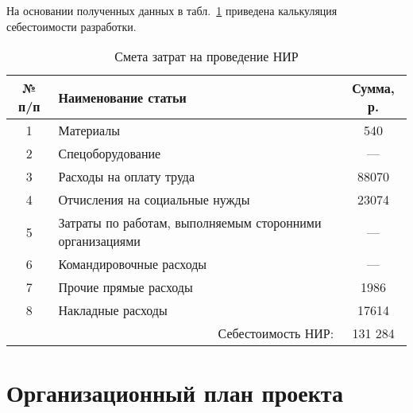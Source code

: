 На основании полученных данных в табл.~\ref{tab:calc} приведена калькуляция себестоимости разработки.

\begin{table}[ht]
\caption{Смета затрат на проведение НИР}
\begin{tabular}{|c|p{10cm}|c|}
\hline
№ п/п&Наименование статьи&Сумма, р.\\
\hline
1&Материалы&540\\
\hline
2&Спецоборудование&---\\
\hline
3&Расходы на оплату труда&88070\\
\hline
4&Отчисления на социальные нужды&23074\\
\hline
5&Затраты по работам, выполняемым сторонними организациями&---\\
\hline
6&Командировочные расходы&---\\
\hline
7&Прочие прямые расходы&1986\\
\hline
8&Накладные расходы&17614\\
\hline
\multicolumn{2}{|r|}{Себестоимость НИР:}&131 284\\
\hline
\end{tabular}
\label{tab:calc}
\end{table}

\section{Организационный план проекта}

